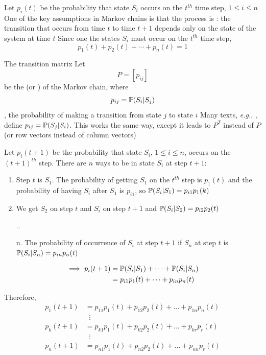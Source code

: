 \documentclass[aspectratio=169]{beamer}
\begin{document}
\begin{frame} 
Let $p_i(t)$ be the probability that state $S_i$ occurs on the $t^{th}$ time step, $1\leq i\leq n$
\vfill
One of the key assumptions in Markov chains is that the process is : the transition that occurs from time $t$ to time $t+1$ depends only on the state of the system at time $t$
\vfill
Since one the states $S_i$ must occur on the $t^{th}$ time step,
\[
p_1(t)+p_2(t)+\cdots+p_n(t)=1
\]
\end{frame}

\begin{frame}{The transition matrix}
Let
\[
P=[p_{ij}]
\]
be the  (or ) of the Markov chain, where
\[
p_{ij} = \mathbb{P}(S_i|S_j)
\]
\ie, the probability of making a transition from state $j$ to state $i$
\vfill
Many texts, \emph{e.g.}, \cite{KemenySnell1983}, define $p_{ij}=\mathbb{P}(S_j|S_i)$. This works the same way, except it leads to $P^T$ instead of $P$ (or row vectors instead of column vectors)
\end{frame}

\begin{frame} 
Let $p_i(t+1)$ be the probability that state $S_i$, $1\leq i\leq n$, occurs on the $(t+1)^{th}$ step. 
There are $n$ ways to be in state $S_i$ at step $t+1$:
\begin{enumerate}
	\item Step $t$ is $S_1$. The probability of getting $S_1$ on the $t^{th}$ step is $p_1(t)$ and the probability of having $S_i$ after $S_1$ is $p_{i1}$, so $\mathbb{P}(S_i|S_1)=p_{i1}p_1(k)$
	\item We get $S_2$ on step $t$ and $S_i$ on step $t+1$ and $\mathbb{P}(S_i|S_2)=p_{i2}p_2(t)$
	\item[..]
	\item[n.] The probability of occurrence of $S_i$ at step $t+1$ if $S_n$ at step $t$ is $\mathbb{P}(S_i|S_n)=p_{in}p_n(t)$
\end{enumerate}
\vfill
\begin{align*}
\implies p_i(t+1) &= \mathbb{P}(S_i|S_1)+\cdots+\mathbb{P}(S_i|S_n) \\
&= p_{i1}p_1(t)+\cdots+p_{in}p_n(t)
\end{align*}
\end{frame}

\begin{frame} 
Therefore,
\begin{align*}
p_1(t+1) &= p_{11}p_1(t)+p_{12}p_2(t)+\dots+p_{1n}p_n(t) \\
& \;\;\vdots\\
p_k(t+1) &= p_{k1}p_1(t)+p_{k2}p_2(t)+\dots+p_{kr}p_r(t) \\
& \;\;\vdots\\
p_n(t+1) &= p_{n1}p_1(t)+p_{n2}p_2(t)+\dots+p_{nn}p_r(t)
\end{align*}
\end{frame}
\end{document}
